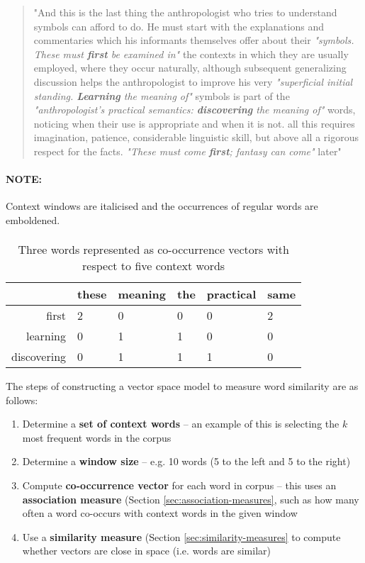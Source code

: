 \documentclass{article}
\begin{document}
\begin{quote}
"And this is the last thing the anthropologist who tries to understand symbols can afford to do. He must start with the explanations and commentaries which his informants themselves offer about their \textit{"symbols. These must \textbf{first} be examined in"} the contexts in which they are usually employed, where they occur naturally, although subsequent generalizing discussion helps the anthropologist to improve his very \textit{"superficial initial standing. \textbf{Learning} the meaning of"} symbols is part of the \textit{"anthropologist's practical semantics: \textbf{discovering} the meaning of"} words, noticing when their use is appropriate and when it is not. all this requires imagination, patience, considerable linguistic skill, but above all a rigorous respect for the facts. \textit{"These must come \textbf{first}; fantasy can come"} later"
\end{quote}

\paragraph{\textbf{NOTE:}} Context windows are italicised and the occurrences of regular words are emboldened.

\paragraph{}

\begin{table}[H]
	\centering
	\begin{tabular}{|r|l|l|l|l|l|}
		\hline
		& these & meaning & the & practical & same \\
		\hline
		first & 2 & 0 & 0 & 0 & 2 \\
		learning & 0 & 1 & 1 & 0 & 0 \\
		discovering & 0 & 1 & 1 & 1 & 0 \\
		\hline
	\end{tabular}
	\caption{Three words represented as co-occurrence vectors with respect to five context words}
	\label{tab:vsm-co-occurrence-vectors}
\end{table}

The steps of constructing a vector space model to measure word similarity are as follows:
\begin{enumerate}
	\item Determine a \textbf{set of context words} -- an example of this is selecting the $k$ most frequent words in the corpus
	\item Determine a \textbf{window size} -- e.g. 10 words (5 to the left and 5 to the right)
	\item Compute \textbf{co-occurrence vector} for each word in corpus -- this uses an \textbf{association measure} (Section \ref{sec:association-measures}, such as how many often a word co-occurs with context words in the given window
	\item Use a \textbf{similarity measure} (Section \ref{sec:similarity-measures} to compute whether vectors are close in space (i.e. words are similar)
\end{enumerate}
\end{document}
